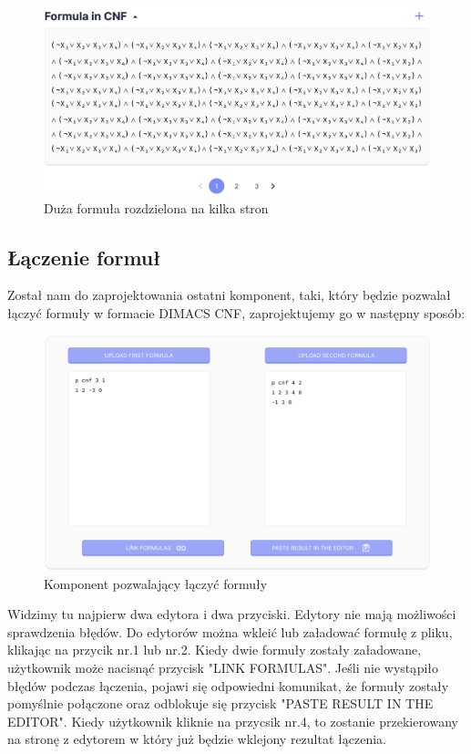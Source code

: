 \documentclass[a4paper,12pt,oneside]{book}
\theoremstyle{definition}
\begin{document}
\begin{figure}[ht]
    \centering
    \includegraphics[width=14.30cm]{10}
    \caption{Duża formuła rozdzielona na kilka stron}
    \label{fig:10}
\end{figure}

\subsection{Łączenie formuł}

Został nam do zaprojektowania ostatni komponent, taki, który będzie pozwalał łączyć formuły w formacie DIMACS CNF, zaprojektujemy go w następny sposób: 

\begin{figure}[ht]
    \centering
    \includegraphics[width=14.30cm]{11}
    \caption{Komponent pozwalający łączyć formuły}
    \label{fig:11}
\end{figure}

\noindent Widzimy tu najpierw dwa edytora i dwa przyciski. Edytory nie mają możliwości sprawdzenia błędów. Do edytorów można wkleić lub załadować formułę z pliku, klikając na przycik nr.1 lub nr.2. Kiedy dwie formuły zostały załadowane, użytkownik może nacisnąć przycisk "LINK FORMULAS". Jeśli nie wystąpiło błędów podczas łączenia, pojawi się odpowiedni komunikat, że formuły zostały pomyślnie połączone oraz odblokuje się przycisk "PASTE RESULT IN THE EDITOR". Kiedy użytkownik kliknie na przycsik nr.4, to zostanie przekierowany na stronę z edytorem w który już będzie wklejony rezultat łączenia.
\end{document}
